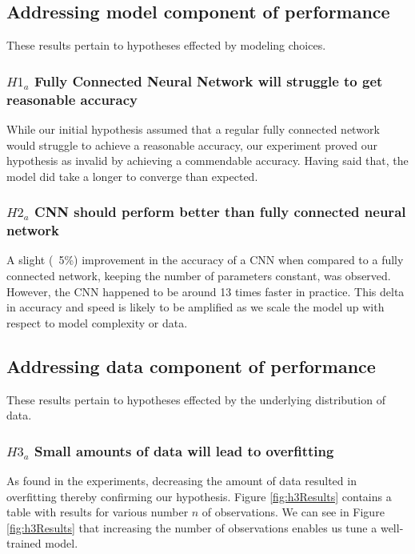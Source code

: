 \documentclass[11pt]{article}
\begin{document}
\subsection{Addressing model component of performance}

These results pertain to hypotheses effected by modeling choices.

\subsubsection{$H1_a$\: Fully Connected Neural Network will struggle to
  get reasonable accuracy}

While our initial hypothesis assumed that a regular fully connected
network would struggle to achieve a reasonable accuracy, our experiment
proved our hypothesis as invalid by achieving a commendable accuracy.
Having said that, the model did take a longer to converge than expected. 

\subsubsection{$H2_a$\: CNN should perform better than fully connected neural
  network}

A slight (~5\%) improvement in the accuracy of a CNN when compared to a fully
connected network, keeping the number of parameters constant, was observed.
However, the CNN happened to be around 13 times faster in practice. This
delta in accuracy and speed is likely to be amplified as we scale the model
up with respect to model complexity or data.

\subsection{Addressing data component of performance}

These results pertain to hypotheses effected by the underlying
distribution of data.

\subsubsection{$H3_a$\: Small amounts of data will lead to overfitting}

As found in the experiments, decreasing the amount of data resulted
in overfitting thereby confirming our hypothesis. Figure \ref{fig:h3Results}
contains a table with results for various number $n$ of observations. We
can see in Figure \ref{fig:h3Results} that increasing the number of
observations enables us tune a well-trained model.
\end{document}
